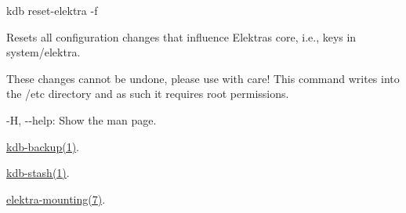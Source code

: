 {\ttfamily kdb reset-\/elektra -\/f}

Resets all configuration changes that influence Elektra\textquotesingle{}s core, i.\+e., keys in {\ttfamily system/elektra}.

These changes cannot be undone, please use with care! This command writes into the {\ttfamily /etc} directory and as such it requires root permissions.


\begin{DoxyItemize}
\item {\ttfamily -\/H}, {\ttfamily -\/-\/help}\+: Show the man page.
\end{DoxyItemize}


\begin{DoxyItemize}
\item \hyperlink{doc_help_kdb-backup_md}{kdb-\/backup(1)}.
\item \hyperlink{doc_help_kdb-stash_md}{kdb-\/stash(1)}.
\item \hyperlink{doc_help_elektra-mounting_md}{elektra-\/mounting(7)}. 
\end{DoxyItemize}